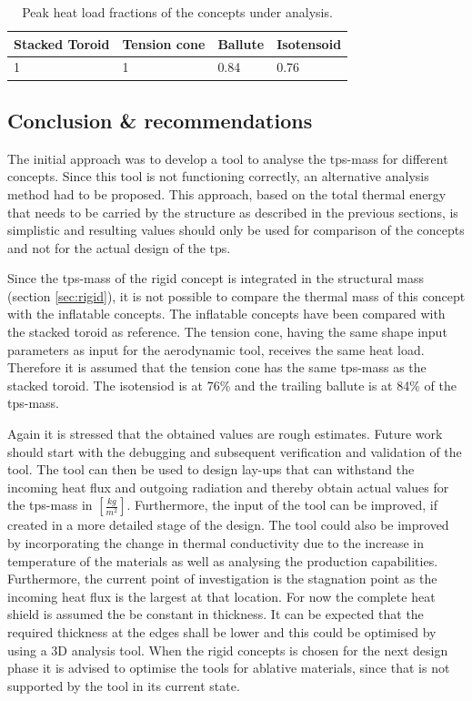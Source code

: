 \begin{table}[H]
	\centering
	\caption {Peak heat load fractions of the concepts under analysis.}
	\begin{tabular}{|l|l|l|l|}
		\hline
		Stacked Toroid & Tension cone & Ballute & Isotensoid \\ \hline
		1              & 1            & 0.84    & 0.76       \\ \hline
	\end{tabular}
	\label{tab:fractions}
\end{table}

\subsection{Conclusion \& recommendations}
The initial approach was to develop a tool to analyse the \gls{tps}-mass for different concepts. Since this tool is not functioning correctly, an alternative analysis method had to be proposed. This approach, based on the total thermal energy that needs to be carried by the structure as described in the previous sections, is simplistic and resulting values should only be used for comparison of the concepts and not for the actual design of the \gls{tps}. 

Since the \gls{tps}-mass of the rigid concept is integrated in the structural mass (section \ref{sec:rigid}), it is not possible to compare the thermal mass of this concept with the inflatable concepts. The inflatable concepts have been compared with the stacked toroid as reference. The tension cone, having the same shape input parameters as input for the aerodynamic tool, receives the same heat load. Therefore it is assumed that the tension cone has the same \gls{tps}-mass as the stacked toroid. The isotensiod is at 76\% and the trailing ballute is at 84\% of the \gls{tps}-mass.

Again it is stressed that the obtained values are rough estimates. Future work should start with the debugging and subsequent verification and validation of the tool. The tool can then be used to design lay-ups that can withstand the incoming heat flux and outgoing radiation and thereby obtain actual values for the \gls{tps}-mass in $\left[\frac{kg}{m^2}\right]$. Furthermore, the input of the tool can be improved, if created in a more detailed stage of the design. The tool could also be improved by incorporating the change in thermal conductivity due to the increase in temperature of the materials as well as analysing the production capabilities. Furthermore, the current point of investigation is the stagnation point as the incoming heat flux is the largest at that location. For now the complete heat shield is assumed the be constant in thickness. It can be expected that the required thickness at the edges shall be lower and this could be optimised by using a 3D analysis tool. When the rigid concepts is chosen for the next design phase it is advised to optimise the tools for ablative materials, since that is not supported by the tool in its current state.



